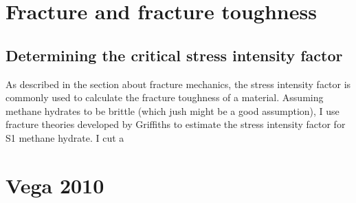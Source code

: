 \section{Fracture and fracture toughness}

\subsection{Determining the critical stress intensity factor}
As described in the section about fracture mechanics, the stress intensity factor is commonly used to calculate the fracture toughness of a material. Assuming methane hydrates to be brittle (which jush might be a good assumption), I use fracture theories developed by Griffiths to estimate the stress intensity factor for S1 methane hydrate. I cut a 

\section{Vega 2010}


